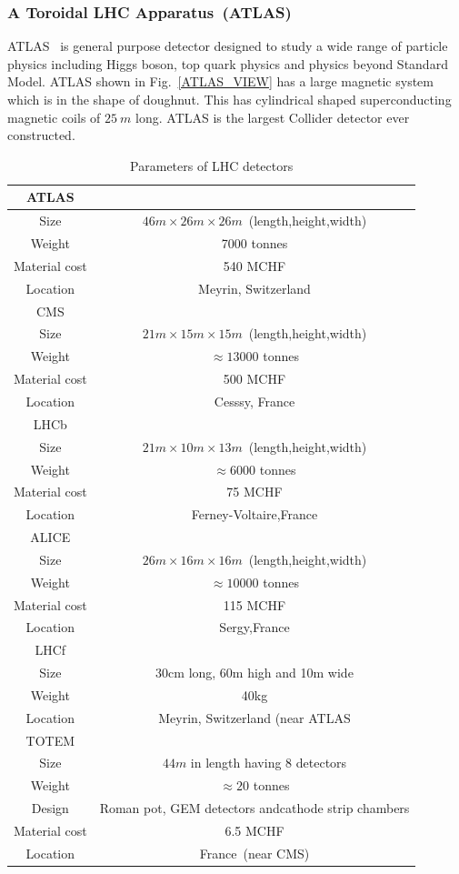 \subsubsection{A Toroidal LHC Apparatus~(ATLAS)}
ATLAS~\cite{Collaboration_2008atlas} is general purpose detector designed to study a wide range of particle physics including Higgs boson, top quark physics and physics beyond Standard Model. ATLAS shown in Fig.~\ref{ATLAS_VIEW} has a large magnetic system which is in the shape of doughnut. This has cylindrical shaped superconducting magnetic coils of $25~m$ long. ATLAS is the largest Collider detector ever constructed.

\begin{table}[h!]
\caption{Parameters of LHC detectors}
\centering
\begin{tabular}{|c|c|}
\hline
ATLAS&\\
\hline
Size&$46m\times26m\times26m$~(length,height,width)\\
Weight&7000 tonnes\\
Material cost&540 MCHF\\
Location&Meyrin, Switzerland\\
\hline
CMS&\\
\hline
Size&$21m\times15m\times15m$~(length,height,width)\\
Weight&$\approx13000$ tonnes\\
Material cost&500 MCHF\\
Location&Cesssy, France\\
\hline
LHCb&\\
\hline
Size&$21m\times10m\times13m$~(length,height,width)\\
Weight&$\approx6000$ tonnes\\
Material cost&75 MCHF\\
Location&Ferney-Voltaire,France\\
\hline
ALICE&\\
\hline
Size&$26m\times16m\times16m$~(length,height,width)\\
Weight&$\approx10000$ tonnes\\
Material cost&115 MCHF\\
Location&Sergy,France\\
\hline
LHCf&\\
\hline
Size&30cm long, 60m high and 10m wide\\
Weight&40kg \\
Location&Meyrin, Switzerland (near ATLAS\\
\hline
TOTEM&\\
\hline
Size&$44m$ in length having 8 detectors\\
Weight&$\approx20$ tonnes\\
Design&Roman pot, GEM detectors and\newline cathode strip chambers\\
Material cost&6.5 MCHF\\
Location& France~(near CMS)\\
\hline
\end{tabular}
\end{table}

